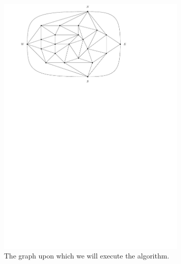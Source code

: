 \begin{figure}
    \centering
    \begin{subfigure}[b]{.9 \textwidth}
      \includegraphics[width=\textwidth]{examples/img/smallExample/smallExample-1}
      \caption{The graph upon which we will execute the algorithm.}
      \label{fig:ex:simple:1}
    \end{subfigure}
    ~
    \begin{subfigure}[b]{.9 \textwidth}

\end{subfigure}
\end{figure}
